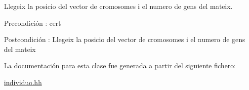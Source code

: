 Llegeix la posicio del vector de cromosomes i el numero de gens del mateix. 

\begin{DoxyPrecond}{Precondición}
\+: cert 
\end{DoxyPrecond}
\begin{DoxyPostcond}{Postcondición}
\+: Llegeix la posicio del vector de cromosomes i el numero de gens del mateix 
\end{DoxyPostcond}


La documentación para esta clase fue generada a partir del siguiente fichero\+:\begin{DoxyCompactItemize}
\item 
\hyperlink{individuo_8hh}{individuo.\+hh}\end{DoxyCompactItemize}
